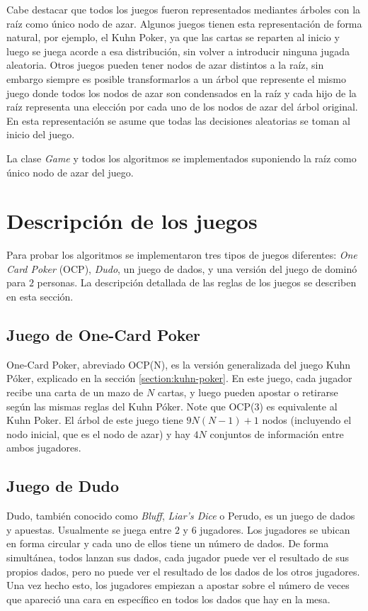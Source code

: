 Cabe destacar que todos los juegos fueron representados mediantes árboles con la raíz como único nodo de azar. Algunos juegos tienen esta representación de forma natural, por ejemplo, el Kuhn Poker, ya que las cartas se reparten al inicio y luego se juega acorde a esa distribución, sin volver a introducir ninguna jugada aleatoria. Otros juegos pueden tener nodos de azar distintos a la raíz, sin embargo siempre es posible transformarlos a un árbol que represente el mismo juego donde todos los nodos de azar son condensados en la raíz y cada hijo de la raíz representa una elección por cada uno de los nodos de azar del árbol original. En esta representación se asume que todas las decisiones aleatorias se toman al inicio del juego.

La clase \textit{Game} y todos los algoritmos se implementados suponiendo la raíz como único nodo de azar del juego.



\section{Descripción de los juegos}
\label{section-description-juegos-forma-extensiva}

Para probar los algoritmos se implementaron tres tipos de juegos diferentes: \textit{One Card Poker} (OCP), \textit{Dudo}, un juego de dados, y una versión del juego de dominó para $2$ personas. La descripción detallada de las reglas de los juegos se describen en esta sección.

\subsection*{Juego de One-Card Poker}
One-Card Poker, abreviado OCP(N), es la versión generalizada del juego Kuhn Póker, explicado en la sección \ref{section:kuhn-poker}. En este juego, cada jugador recibe una carta de un mazo de $N$ cartas, y luego pueden apostar o retirarse según las mismas reglas del Kuhn Póker. Note que OCP(3) es equivalente al Kuhn Poker. El árbol de este juego tiene $9N(N-1)+1$ nodos (incluyendo el nodo inicial, que es el nodo de azar) y hay $4N$ conjuntos de información entre ambos jugadores. 

\subsection*{Juego de Dudo}
Dudo, también conocido como \textit{Bluff}, \textit{Liar's Dice} o Perudo, es un juego de dados y apuestas. Usualmente se juega entre $2$ y $6$ jugadores. Los jugadores se ubican en forma circular y cada uno de ellos tiene un número de dados. De forma simultánea, todos lanzan sus dados, cada jugador puede ver el resultado de sus propios dados, pero no puede ver el resultado de los dados de los otros jugadores. Una vez hecho esto, los jugadores empiezan a apostar sobre el número de veces que apareció una cara en específico en todos los dados que hay en la mesa.

